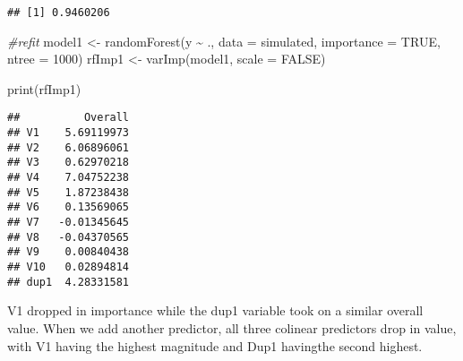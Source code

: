 \documentclass[
]{article}
\newenvironment{Shaded}{\begin{snugshade}}{\end{snugshade}}
\newcommand{\AttributeTok}[1]{\textcolor[rgb]{0.77,0.63,0.00}{#1}}
\newcommand{\CommentTok}[1]{\textcolor[rgb]{0.56,0.35,0.01}{\textit{#1}}}
\newcommand{\ConstantTok}[1]{\textcolor[rgb]{0.00,0.00,0.00}{#1}}
\newcommand{\DecValTok}[1]{\textcolor[rgb]{0.00,0.00,0.81}{#1}}
\newcommand{\FloatTok}[1]{\textcolor[rgb]{0.00,0.00,0.81}{#1}}
\newcommand{\FunctionTok}[1]{\textcolor[rgb]{0.00,0.00,0.00}{#1}}
\newcommand{\NormalTok}[1]{#1}
\newcommand{\OtherTok}[1]{\textcolor[rgb]{0.56,0.35,0.01}{#1}}
\newcommand{\SpecialCharTok}[1]{\textcolor[rgb]{0.00,0.00,0.00}{#1}}
\begin{document}
\begin{Shaded}
\end{Shaded}

\begin{verbatim}
## [1] 0.9460206
\end{verbatim}

\begin{Shaded}
\begin{Highlighting}[]
\CommentTok{\#refit}
\NormalTok{model1 }\OtherTok{\textless{}{-}} \FunctionTok{randomForest}\NormalTok{(y }\SpecialCharTok{\textasciitilde{}}\NormalTok{ ., }\AttributeTok{data =}\NormalTok{ simulated, }\AttributeTok{importance =} \ConstantTok{TRUE}\NormalTok{,}
\AttributeTok{ntree =} \DecValTok{1000}\NormalTok{) }
\NormalTok{rfImp1 }\OtherTok{\textless{}{-}} \FunctionTok{varImp}\NormalTok{(model1, }\AttributeTok{scale =} \ConstantTok{FALSE}\NormalTok{)}

\FunctionTok{print}\NormalTok{(rfImp1)}
\end{Highlighting}
\end{Shaded}

\begin{verbatim}
##          Overall
## V1    5.69119973
## V2    6.06896061
## V3    0.62970218
## V4    7.04752238
## V5    1.87238438
## V6    0.13569065
## V7   -0.01345645
## V8   -0.04370565
## V9    0.00840438
## V10   0.02894814
## dup1  4.28331581
\end{verbatim}

V1 dropped in importance while the dup1 variable took on a similar
overall value. When we add another predictor, all three colinear
predictors drop in value, with V1 having the highest magnitude and Dup1
havingthe second highest.

\begin{Shaded}
\end{Shaded}
\end{document}
